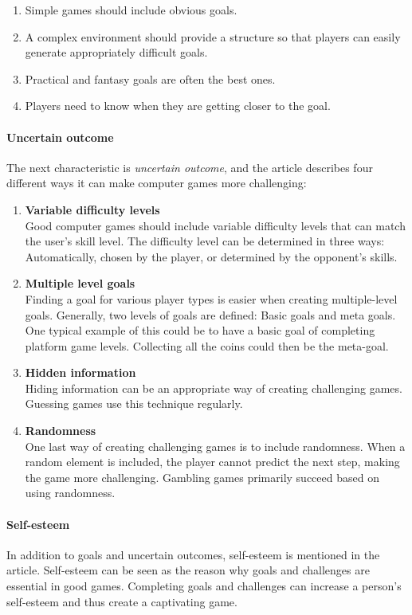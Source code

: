 \begin{enumerate}
    \item Simple games should include obvious goals.
    \item A complex environment should provide a structure so that players can easily generate appropriately difficult goals.
    \item Practical and fantasy goals are often the best ones.
    \item Players need to know when they are getting closer to the goal.
\end{enumerate}

\paragraph*{Uncertain outcome} 
The next characteristic is \textit{uncertain outcome}, and the article describes four different ways  it can make computer games more challenging:

\begin{enumerate}
    \item \textbf{Variable difficulty levels}\\ 
    Good computer games should include variable difficulty levels that can match the user’s skill level. The difficulty level can be determined in three ways: Automatically, chosen by the player, or determined by the opponent’s skills.
    \item \textbf{Multiple level goals} \\ 
    Finding a goal for various player types is easier when creating multiple-level goals. Generally, two levels of goals are defined: Basic goals and meta goals. One typical example of this could be to have a basic goal of completing platform game levels. Collecting all the coins could then be the meta-goal. 
    \item \textbf{Hidden information} \\
    Hiding information can be an appropriate way of creating challenging games. Guessing games use this technique regularly.
    \item \textbf{Randomness} \\
    One last way of creating challenging games is to include randomness. When a random element is included, the player cannot predict the next step, making the game more challenging. Gambling games primarily succeed based on using randomness.
\end{enumerate}

\paragraph*{Self-esteem}
In addition to goals and uncertain outcomes, self-esteem is mentioned in the article. Self-esteem can be seen as the reason why goals and challenges are essential in good games. Completing goals and challenges can increase a person’s self-esteem and thus create a captivating game.

